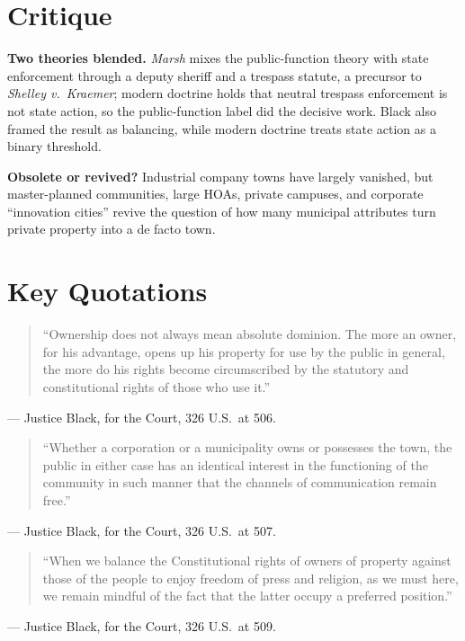 \documentclass[12pt]{article}
\begin{document}
\section{Critique}

\textbf{Two theories blended.} \textit{Marsh} mixes the public-function theory with state enforcement through a deputy sheriff and a trespass statute, a precursor to \textit{Shelley v.\ Kraemer}; modern doctrine holds that neutral trespass enforcement is not state action, so the public-function label did the decisive work. Black also framed the result as balancing, while modern doctrine treats state action as a binary threshold.

\textbf{Obsolete or revived?} Industrial company towns have largely vanished, but master-planned communities, large HOAs, private campuses, and corporate ``innovation cities'' revive the question of how many municipal attributes turn private property into a de facto town.

\section{Key Quotations}

\begin{quote}
``Ownership does not always mean absolute dominion. The more an owner, for his advantage, opens up his property for use by the public in general, the more do his rights become circumscribed by the statutory and constitutional rights of those who use it.''
\end{quote}
\noindent --- Justice Black, for the Court, 326 U.S.\ at 506.

\begin{quote}
``Whether a corporation or a municipality owns or possesses the town, the public in either case has an identical interest in the functioning of the community in such manner that the channels of communication remain free.''
\end{quote}
\noindent --- Justice Black, for the Court, 326 U.S.\ at 507.

\begin{quote}
``When we balance the Constitutional rights of owners of property against those of the people to enjoy freedom of press and religion, as we must here, we remain mindful of the fact that the latter occupy a preferred position.''
\end{quote}
\noindent --- Justice Black, for the Court, 326 U.S.\ at 509.
\end{document}
